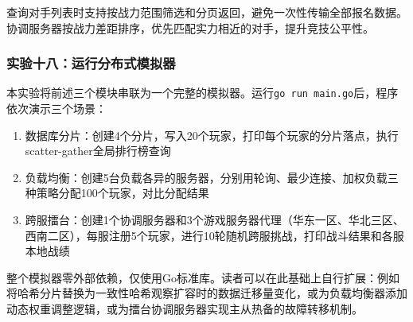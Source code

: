 查询对手列表时支持按战力范围筛选和分页返回，避免一次性传输全部报名数据。协调服务器按战力差距排序，优先匹配实力相近的对手，提升竞技公平性。

\subsubsection{实验十八：运行分布式模拟器}

本实验将前述三个模块串联为一个完整的模拟器。运行\texttt{go run main.go}后，程序依次演示三个场景：

\begin{enumerate}
\item 数据库分片：创建4个分片，写入20个玩家，打印每个玩家的分片落点，执行scatter-gather全局排行榜查询
\item 负载均衡：创建5台负载各异的服务器，分别用轮询、最少连接、加权负载三种策略分配100个玩家，对比分配结果
\item 跨服擂台：创建1个协调服务器和3个游戏服务器代理（华东一区、华北三区、西南二区），每服注册5个玩家，进行10轮随机跨服挑战，打印战斗结果和各服本地战绩
\end{enumerate}

整个模拟器零外部依赖，仅使用Go标准库。读者可以在此基础上自行扩展：例如将哈希分片替换为一致性哈希观察扩容时的数据迁移量变化，或为负载均衡器添加动态权重调整逻辑，或为擂台协调服务器实现主从热备的故障转移机制。

